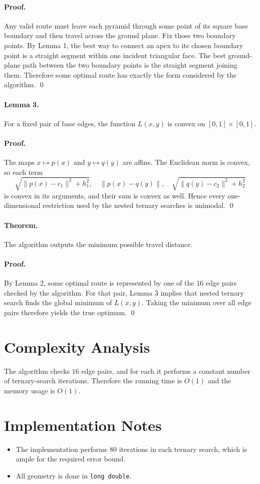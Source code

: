 \documentclass[11pt]{article}
\begin{document}
\paragraph{Proof.}
Any valid route must leave each pyramid through some point of its square base boundary and then travel
across the ground plane. Fix those two boundary points. By Lemma 1, the best way to connect an apex to
its chosen boundary point is a straight segment within one incident triangular face. The best ground-plane
path between the two boundary points is the straight segment joining them. Therefore some optimal route
has exactly the form considered by the algorithm. \qed

\paragraph{Lemma 3.}
For a fixed pair of base edges, the function $L(x,y)$ is convex on $[0,1]\times[0,1]$.

\paragraph{Proof.}
The maps $x \mapsto p(x)$ and $y \mapsto q(y)$ are affine. The Euclidean norm is convex, so each term
\[
\sqrt{\|p(x)-c_1\|^2+h_1^2},\quad \|p(x)-q(y)\|,\quad \sqrt{\|q(y)-c_2\|^2+h_2^2}
\]
is convex in its arguments, and their sum is convex as well. Hence every one-dimensional restriction used
by the nested ternary searches is unimodal. \qed

\paragraph{Theorem.}
The algorithm outputs the minimum possible travel distance.

\paragraph{Proof.}
By Lemma 2, some optimal route is represented by one of the $16$ edge pairs checked by the algorithm.
For that pair, Lemma 3 implies that nested ternary search finds the global minimum of $L(x,y)$. Taking
the minimum over all edge pairs therefore yields the true optimum. \qed

\section*{Complexity Analysis}

The algorithm checks $16$ edge pairs, and for each it performs a constant number of ternary-search
iterations. Therefore the running time is $O(1)$ and the memory usage is $O(1)$.

\section*{Implementation Notes}

\begin{itemize}[leftmargin=*]
    \item The implementation performs $80$ iterations in each ternary search, which is ample for the
    required error bound.
    \item All geometry is done in \texttt{long double}.
\end{itemize}
\end{document}
